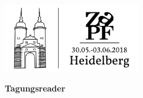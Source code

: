 \documentclass{scrbook}
\begin{document}
\pagestyle{empty}
\centering
\vspace*{-10mm}

\includegraphics[width=60mm]{vorlagen/logo.png}

\vspace*{14cm} \centering \fontsize{40}{48} \textbf{Tagungsreader}
\normalsize

\end{document}
